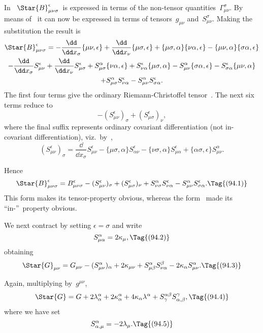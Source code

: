 \documentclass[12pt]{book}
\begin{document}
In~ $\Star{B}_{\mu\nu\sigma}^{\epsilon}$~is expressed in terms of the non-tensor quantities~$\Gamma_{\mu\nu}^{\sigma}$.
By means of~ it can now be expressed in terms of tensors~$g_{\mu\nu}$ and~$S_{\mu\nu}^{\sigma}$.
Making the substitution the result is
\begin{multline*}
  \Star{B}_{\mu\nu\sigma}^{\epsilon}
  = -\frac{\dd}{\dd x_{\sigma}} \{\mu\nu, \epsilon\}
  + \frac{\dd}{\dd x_{\nu}} \{\mu\sigma, \epsilon\}
  + \{\mu\sigma, \alpha\} \{\nu\alpha, \epsilon\}
  - \{\mu\nu, \alpha\} \{\sigma\alpha, \epsilon\} \\
  - \frac{\dd}{\dd x_{\sigma}} S_{\mu\nu}^{\epsilon}
  + \frac{\dd}{\dd x_{\nu}} S_{\mu\sigma}^{\epsilon}
  + S_{\mu\sigma}^{\alpha} \{\nu\alpha, \epsilon\}
  + S_{\nu\alpha}^{\epsilon} \{\mu\sigma, \alpha\}
  - S_{\mu\nu}^{\alpha} \{\sigma\alpha, \epsilon\}
  - S_{\sigma\alpha}^{\epsilon} \{\mu\nu, \alpha\} \\
  + S_{\mu\sigma}^{\alpha} S_{\nu\alpha}^{\epsilon}
  - S_{\mu\nu}^{\alpha} S_{\sigma\alpha}^{\epsilon}.
\end{multline*}
The first four terms give the ordinary Riemann-Christoffel tensor~. The
next six terms reduce to
\[
-(S_{\mu\nu}^{\epsilon})_{\sigma} + (S_{\mu\sigma}^{\epsilon})_{\nu},
\]
where the final suffix represents ordinary covariant differentiation (not in-covariant
differentiation), viz.\ by~,
\[
(S_{\mu\nu}^{\epsilon})_{\sigma}
= \frac{\dd}{\dd x_{\sigma}} S_{\mu\nu}^{\epsilon}
- \{\mu\sigma, \alpha\} S_{\alpha\nu}^{\epsilon}
- \{\nu\sigma, \alpha\} S_{\mu\alpha}^{\epsilon}
+ \{\alpha\sigma, \epsilon\}  S_{\mu\nu}^{\alpha} .
\]

Hence
\[
\Star{B}_{\mu\nu\sigma}^{\epsilon}
= B_{\mu\nu\sigma}^{\epsilon} - (S_{\mu\nu}^{\epsilon})_{\sigma} + (S_{\mu\sigma}^{\epsilon})_{\nu}
+ S_{\nu\sigma}^{\alpha} S_{\nu\alpha}^{\epsilon} - S_{\mu\nu}^{\alpha} S_{\sigma\alpha}^{\epsilon}.
\Tag{(94.1)}
\]
This form makes its tensor-property obvious, whereas the form~ made
its ``in-''~property obvious.

We next contract by setting $\epsilon = \sigma$ and write
\[
S_{\mu\alpha}^{\alpha} = 2\kappa_{\mu},
\Tag{(94.2)}
\]
obtaining
\[
\Star{G}_{\mu\nu} = G_{\mu\nu} - (S_{\mu\nu}^{\alpha})_{\alpha}
+ 2\kappa_{\mu\nu} + S_{\mu\beta}^{\alpha} S_{\nu\alpha}^{\beta}
- 2\kappa_{\alpha} S_{\mu\nu}^{\alpha}.
\Tag{(94.3)}
\]

Again, multiplying by~$g^{\mu\nu}$,
\[
\Star{G} = G + 2\lambda_{\alpha}^{\alpha} + 2\kappa_{\alpha}^{\alpha}
+ 4\kappa_{\alpha} \lambda^{\alpha} + S_{\gamma}^{\alpha\beta} S_{\alpha,\beta}^{\gamma},
\Tag{(94.4)}
\]
where we have set
\[
S_{\alpha,\mu}^{\alpha} = -2\lambda_{\mu}.
\Tag{(94.5)}
\]
\end{document}
